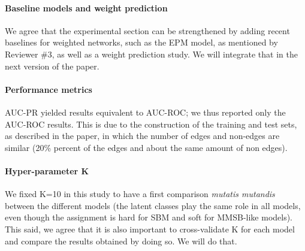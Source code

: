 \documentclass{article}
\begin{document}
\paragraph{Baseline models and weight prediction} We agree that the experimental section can be strengthened by adding recent baselines for weighted networks, such as the EPM model, as mentioned by Reviewer \#3, as well as a weight prediction study. We will integrate that in the next version of the paper.

\paragraph{Performance metrics}  AUC-PR yielded results equivalent to AUC-ROC; we thus reported only the AUC-ROC results. This is due to the construction of the training and test sets, as described in the paper, in which the number of edges and non-edges are similar (20\% percent of the edges and about the same amount of non edges).

\paragraph{Hyper-parameter K} We fixed K=10 in this study to have a first comparison \textit{mutatis mutandis} between the different models (the latent classes play the same role in all models, even though the assignment is hard for SBM and soft for MMSB-like models). This said, we agree that it is also important to cross-validate K for each model and compare the results obtained by doing so. We will do that.
\end{document}
